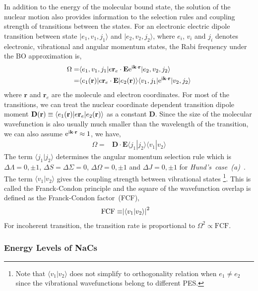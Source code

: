 In addition to the energy of the molecular bound state,
the solution of the nuclear motion also provides information to the selection rules
and coupling strength of transitions between the states.
For an electronic electric dipole transition between state
$|e_1,v_1,j_1\rangle$ and $|e_2,v_2,j_2\rangle$,
where $e_i$, $v_i$ and $j_i$ denotes electronic, vibrational and angular momentum states,
the Rabi frequency under the BO approximation is,
\begin{align*}
  \Omega=&\langle e_1,v_1,j_1|e\mathbf{r}_e\cdot\mathbf{E}\mathrm{e}^{\mathrm{i}\mathbf{k}\cdot\mathbf{r}}|e_2,v_2,j_2\rangle\\
  =&\langle e_1(\mathbf{r})|e\mathbf{r}_e\cdot\mathbf{E}|e_2(\mathbf{r})\rangle\langle v_1,j_1|\mathrm{e}^{\mathrm{i}\mathbf{k}\cdot\mathbf{r}}|v_2,j_2\rangle
\end{align*}
where $\mathbf{r}$ and $\mathbf{r}_e$ are the molecule and electron coordinates.
For most of the transitions, we can treat the nuclear coordinate dependent transition dipole
moment $\mathbf{D}{\left({\mathbf{r}}\right)}\equiv\langle e_1(\mathbf{r})|e\mathbf{r}_e|e_2(\mathbf{r})\rangle$ as a constant $\mathbf{D}$.
Since the size of the molecular wavefunction is also usually much smaller than
the wavelength of the transition, we can also assume $\mathrm{e}^{\mathrm{i}\mathbf{k}\cdot\mathbf{r}}\approx 1$,
we have,
\begin{align*}
  \Omega=&\mathbf{D}\cdot\mathbf{E}\langle j_1|j_2\rangle\langle v_1|v_2\rangle
\end{align*}
The term $\langle j_1|j_2\rangle$ determines the angular momentum selection rule which is
$\Delta\Lambda=0,\pm1$, $\Delta S=\Delta\Sigma=0$, $\Delta\Omega=0,\pm1$ and $\Delta J=0,\pm1$
for \textit{Hund's~case~(a)}~\cite[p.~14-15]{straughan_spectroscopy_1976}.
The term $\langle v_1|v_2\rangle$ gives the coupling strength between vibrational states
\footnote{Note that $\langle v_1|v_2\rangle$ does not simplify to orthogonality relation
  when $e_1\neq e_2$ since the vibrational wavefunctions belong to different PES.}.
This is called the Franck-Condon principle and the square of the wavefunction overlap
is defined as the Franck-Condon factor~(FCF),
\begin{align*}
  \mathrm{FCF}\equiv&{\left|{\langle v_1|v_2\rangle}\right|}^2
\end{align*}
For incoherent transition, the transition rate is proportional to $\Omega^2\propto\mathrm{FCF}$.

\subsubsection{Energy Levels of NaCs}

